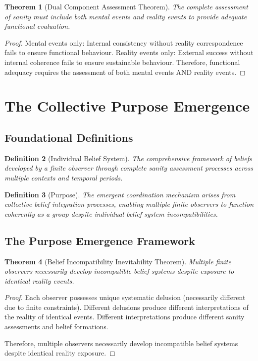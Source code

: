 \documentclass[12pt,a4paper]{article}
\newtheorem{theorem}{Theorem}[section]
\newtheorem{definition}[theorem]{Definition}
\begin{document}
\begin{theorem}[Dual Component Assessment Theorem]
The complete assessment of sanity must include both mental events and reality events to provide adequate functional evaluation.
\end{theorem}

\begin{proof}
Mental events only: Internal consistency without reality correspondence fails to ensure functional behaviour.
Reality events only: External success without internal coherence fails to ensure sustainable behaviour.
Therefore, functional adequacy requires the assessment of both mental events AND reality events.
\end{proof}

\section{The Collective Purpose Emergence}

\subsection{Foundational Definitions}

\begin{definition}[Individual Belief System]
The comprehensive framework of beliefs developed by a finite observer through complete sanity assessment processes across multiple contexts and temporal periods.
\end{definition}

\begin{definition}[Purpose]
The emergent coordination mechanism arises from collective belief integration processes, enabling multiple finite observers to function coherently as a group despite individual belief system incompatibilities.
\end{definition}

\subsection{The Purpose Emergence Framework}

\begin{theorem}[Belief Incompatibility Inevitability Theorem]
Multiple finite observers necessarily develop incompatible belief systems despite exposure to identical reality events.
\end{theorem}

\begin{proof}
Each observer possesses unique systematic delusion (necessarily different due to finite constraints). Different delusions produce different interpretations of the reality of identical events. Different interpretations produce different sanity assessments and belief formations.

Therefore, multiple observers necessarily develop incompatible belief systems despite identical reality exposure.
\end{proof}
\end{document}
